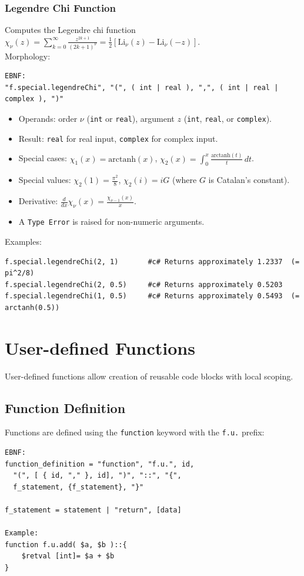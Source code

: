 \subsubsection{Legendre Chi Function}
Computes the Legendre chi function $\chi_\nu(z) = \sum_{k=0}^{\infty} \frac{z^{2k+1}}{(2k+1)^\nu} = \frac{1}{2}[\text{Li}_\nu(z) - \text{Li}_\nu(-z)]$. \\
Morphology:
\begin{verbatim}
EBNF:
"f.special.legendreChi", "(", ( int | real ), ",", ( int | real | complex ), ")"
\end{verbatim}
\begin{itemize}
\item Operands: order $\nu$ (\texttt{int} or \texttt{real}), argument $z$ (\texttt{int}, \texttt{real}, or \texttt{complex}).
\item Result: \texttt{real} for real input, \texttt{complex} for complex input.
\item Special cases: $\chi_1(x) = \text{arctanh}(x)$, $\chi_2(x) = \int_0^x \frac{\text{arctanh}(t)}{t}\,dt$.
\item Special values: $\chi_2(1) = \frac{\pi^2}{8}$, $\chi_2(i) = iG$ (where $G$ is Catalan's constant).
\item Derivative: $\frac{d}{dx}\chi_\nu(x) = \frac{\chi_{\nu-1}(x)}{x}$.
\item A \texttt{Type Error} is raised for non-numeric arguments.
\end{itemize}
Examples:
\begin{verbatim}
f.special.legendreChi(2, 1)       #c# Returns approximately 1.2337  (= pi^2/8)
f.special.legendreChi(2, 0.5)     #c# Returns approximately 0.5203
f.special.legendreChi(1, 0.5)     #c# Returns approximately 0.5493  (= arctanh(0.5))
\end{verbatim}

\section{User-defined Functions}
User-defined functions allow creation of reusable code blocks with local scoping.

\subsection{Function Definition}
Functions are defined using the \texttt{function} keyword with the \texttt{f.u.} prefix:
\begin{verbatim}
EBNF:
function_definition = "function", "f.u.", id, 
  "(", [ { id, "," }, id], ")", "::", "{", 
  f_statement, {f_statement}, "}"

f_statement = statement | "return", [data]

Example:
function f.u.add( $a, $b )::{
    $retval [int]= $a + $b
}
\end{verbatim}

